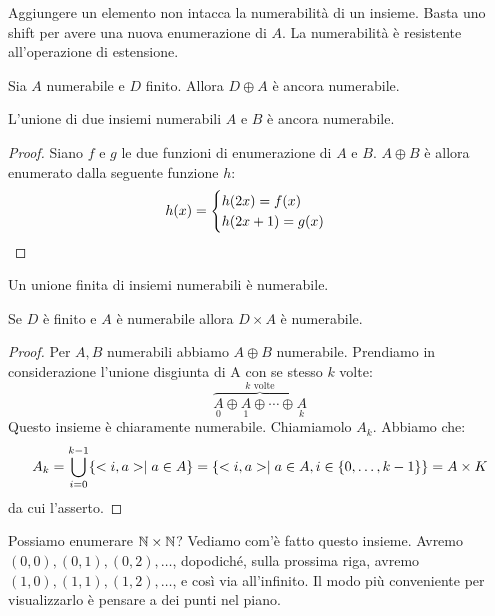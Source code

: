 Aggiungere un elemento non intacca la numerabilità di un insieme. Basta uno shift per avere una
nuova enumerazione di $A$. La numerabilità è resistente all'operazione di estensione.
\begin{cor}
    Sia $A$ numerabile e $D$ finito. Allora $D \oplus A$ è ancora numerabile.
\end{cor}

\begin{lem}
    L'unione di due insiemi numerabili $A$ e $B$ è ancora numerabile.
\end{lem}
\begin{proof}
    Siano $f$ e $g$ le due funzioni di enumerazione di $A$ e $B$. $A \oplus B$ è allora enumerato dalla seguente
    funzione $h$:
    \begin{equation*}
        h(x) =
        \begin{cases}
            h(2x)=f(x) \quad &\text{}\\
            h(2x+1)=g(x) \quad &\text{}\\
        \end{cases}
    \end{equation*}
\end{proof}

\begin{cor}
    Un unione finita di insiemi numerabili è numerabile.
\end{cor}
\begin{cor}
    Se $D$ è finito e $A$ è numerabile allora $D \times A$ è numerabile.
\end{cor}
\begin{proof}
    Per $A,B$ numerabili abbiamo $A \oplus B$ numerabile. Prendiamo in considerazione l'unione
    disgiunta di A con se stesso $k$ volte:
    \begin{equation*}
        \overbrace{\underset{0}{A} \oplus \underset{1}{A} \oplus \cdots \oplus
        \underset{k}{A}}^{\text{$k$ volte}}
    \end{equation*}
    Questo insieme è chiaramente numerabile. Chiamiamolo $A_{k}$. Abbiamo che:
    \begin{equation*}
        A_{k} = \bigcup_{i=0}^{k-1}\{<i,a> \mid a \in A\} = \{<i,a> \mid a \in A, i \in
        \{0,\dotsc,k-1\}\} = A \times K
    \end{equation*}
    da cui l'asserto.
\end{proof}

Possiamo enumerare $\mathbb{N} \times \mathbb{N}$? Vediamo com'è fatto questo insieme. Avremo $(0,0), (0,1),
(0,2),\dotsc$, dopodiché, sulla prossima riga, avremo $(1,0), (1,1), (1,2),\dotsc$, e così via
all'infinito. Il modo più conveniente per visualizzarlo è pensare a dei punti nel piano. 


